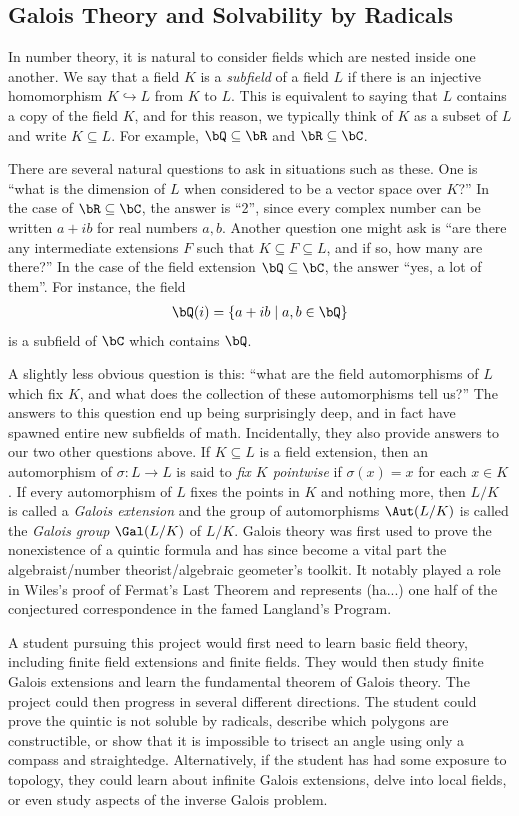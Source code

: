 \subsection{Galois Theory and Solvability by Radicals}
In number theory, it is natural to consider fields which are nested inside one another. We say that a field $K$ is a \emph{subfield} of a field $L$ if there is an injective homomorphism $K\hookrightarrow L$ from $K$ to $L$. This is equivalent to saying that $L$ contains a copy of the field $K$, and for this reason, we typically think of $K$ as a subset of $L$ and write $K \subseteq L$. For example, $\bQ \subseteq \bR$ and $\bR \subseteq \bC$.

There are several natural questions to ask in situations such as these. One is ``what is the dimension of $L$ when considered to be a vector space over $K$?'' In the case of $\bR \subseteq \bC$, the answer is ``2'', since every complex number can be written $a + ib$ for real numbers $a,b$. Another question one might ask is ``are there any intermediate extensions $F$ such that $K \subseteq F\subseteq L$, and if so, how many are there?'' In the case of the field extension $\bQ \subseteq \bC$, the answer ``yes, a lot of them''. For instance, the field
\begin{align*}
	\bQ(i) = \{a + ib \mid a,b \in \bQ\}
\end{align*}
is a subfield of $\bC$ which contains $\bQ$.

A slightly less obvious question is this: ``what are the field automorphisms of $L$ which fix $K$, and what does the collection of these automorphisms tell us?'' The answers to this question end up being surprisingly deep, and in fact have spawned entire new subfields of math. Incidentally, they also provide answers to our two other questions above. If $K\subseteq L$ is a field extension, then an automorphism of $\sigma:L \to L$ is said to \emph{fix $K$ pointwise} if $\sigma(x) = x$ for each $x \in K$. If every automorphism of $L$ fixes the points in $K$ and nothing more, then $L/K$ is called a \emph{Galois extension} and the group of automorphisms $\Aut(L/K)$ is called the \emph{Galois group} $\Gal(L/K)$ of $L/K$. Galois theory was first used to prove the nonexistence of a quintic formula and has since become a vital part the algebraist/number theorist/algebraic geometer's toolkit. It notably played a role in Wiles's proof of Fermat's Last Theorem and represents (ha...) one half of the conjectured correspondence in the famed Langland's Program.

A student pursuing this project would first need to learn basic field theory, including finite field extensions and finite fields. They would then study finite Galois extensions and learn the fundamental theorem of Galois theory. The project could then progress in several different directions. The student could prove the quintic is not soluble by radicals, describe which polygons are constructible, or show that it is impossible to trisect an angle using only a compass and straightedge. Alternatively, if the student has had some exposure to topology, they could learn about infinite Galois extensions, delve into local fields, or even study aspects of the inverse Galois problem.
\newpage
\printbibliography

